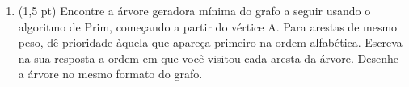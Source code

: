 \documentclass[a4paper,10pt]{article}
\begin{document}
\begin{multicols*}{2}
\begin{enumerate}
  \begin{enumerate}
    \item (1,2 pt) Faça uma DFS no grafo, começando a partir do vértice A e explorando em ordem alfabética. Obtenha a relação de parentesco entre os vértices e desenhe essa relação no formato de uma árvore. Lembre-se de usar uma pilha para organizar a exploração.
    \item (0,8 pt) Classifique todas as arestas do grafo.
    \item (1,0 pt) Transformando o grafo da questão em um DAG (\textit{grafo direcionado acíclico}), temos a matriz de adjacência a seguir. Dê uma ordenação topológica para esse grafo.
  \end{enumerate}

  \begin{equation*}
    \begin{blockarray}{ccccccc}
      & A & B & C & D & E & F \\
      \begin{block}{c(cccccc)}
        A & 0 & 0 & 0 & 0 & 0 & 0 \\
        B & 0 & 0 & 0 & 0 & 1 & 1 \\
        C & 0 & 0 & 0 & 0 & 0 & 0 \\
        D & 0 & 0 & 0 & 0 & 1 & 1 \\
        E & 1 & 0 & 1 & 0 & 0 & 0 \\
        F & 1 & 0 & 1 & 0 & 0 & 0 \\
      \end{block}
      \end{blockarray}
  \end{equation*}

  \item (1,5 pt) Encontre a árvore geradora mínima do grafo a seguir usando o algoritmo de Prim, começando a partir do vértice A. Para arestas de mesmo peso, dê prioridade àquela que apareça primeiro na ordem alfabética. Escreva na sua resposta a ordem em que você visitou cada aresta da árvore. Desenhe a árvore no mesmo formato do grafo.


\end{enumerate}
\end{multicols*}
\end{document}
